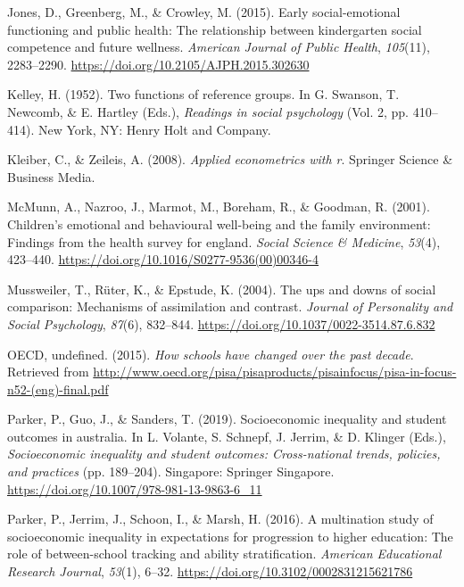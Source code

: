 \documentclass[
  english,
  man]{apa6}
\newlength{\cslhangindent}
\newenvironment{cslreferences}%
  {\setlength{\parindent}{0pt}%
  \everypar{\setlength{\hangindent}{\cslhangindent}}\ignorespaces}%
  {\par}
\begin{document}
\begin{cslreferences}
\leavevmode\hypertarget{ref-jones2015}{}%
Jones, D., Greenberg, M., \& Crowley, M. (2015). Early social-emotional functioning and public health: The relationship between kindergarten social competence and future wellness. \emph{American Journal of Public Health}, \emph{105}(11), 2283--2290. \url{https://doi.org/10.2105/AJPH.2015.302630}

\leavevmode\hypertarget{ref-kelley1952}{}%
Kelley, H. (1952). Two functions of reference groups. In G. Swanson, T. Newcomb, \& E. Hartley (Eds.), \emph{Readings in social psychology} (Vol. 2, pp. 410--414). New York, NY: Henry Holt and Company.

\leavevmode\hypertarget{ref-kleiber2008}{}%
Kleiber, C., \& Zeileis, A. (2008). \emph{Applied econometrics with r}. Springer Science \& Business Media.

\leavevmode\hypertarget{ref-mcmunn2001}{}%
McMunn, A., Nazroo, J., Marmot, M., Boreham, R., \& Goodman, R. (2001). Children's emotional and behavioural well-being and the family environment: Findings from the health survey for england. \emph{Social Science \& Medicine}, \emph{53}(4), 423--440. \url{https://doi.org/10.1016/S0277-9536(00)00346-4}

\leavevmode\hypertarget{ref-mussweiler2004}{}%
Mussweiler, T., Rüter, K., \& Epstude, K. (2004). The ups and downs of social comparison: Mechanisms of assimilation and contrast. \emph{Journal of Personality and Social Psychology}, \emph{87}(6), 832--844. \url{https://doi.org/10.1037/0022-3514.87.6.832}

\leavevmode\hypertarget{ref-oecd2015}{}%
OECD, undefined. (2015). \emph{How schools have changed over the past decade}. Retrieved from \url{http://www.oecd.org/pisa/pisaproducts/pisainfocus/pisa-in-focus-n52-(eng)-final.pdf}

\leavevmode\hypertarget{ref-parker2019}{}%
Parker, P., Guo, J., \& Sanders, T. (2019). Socioeconomic inequality and student outcomes in australia. In L. Volante, S. Schnepf, J. Jerrim, \& D. Klinger (Eds.), \emph{Socioeconomic inequality and student outcomes: Cross-national trends, policies, and practices} (pp. 189--204). Singapore: Springer Singapore. \url{https://doi.org/10.1007/978-981-13-9863-6_11}

\leavevmode\hypertarget{ref-parker2016}{}%
Parker, P., Jerrim, J., Schoon, I., \& Marsh, H. (2016). A multination study of socioeconomic inequality in expectations for progression to higher education: The role of between-school tracking and ability stratification. \emph{American Educational Research Journal}, \emph{53}(1), 6--32. \url{https://doi.org/10.3102/0002831215621786}


\end{cslreferences}
\end{document}
